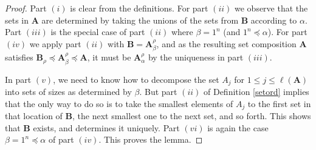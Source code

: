 \documentclass{article}
\theoremstyle{definition}
\begin{document}
\begin{proof}
Part $(i)$ is clear from the definitions. For part $(ii)$ we observe that the sets in $\mathbf{A}$ are determined by taking the unions of the sets from $\mathbf{B}$ according to $\alpha$. Part $(iii)$ is the special case of part $(ii)$ where $\beta=1^{n}$ (and $1^{n}\preceq\alpha$). For part $(iv)$ we apply part $(ii)$ with $\mathbf{B}=\mathbf{A}_{\beta}^{\rho}$, and as the resulting set composition $\mathbf{A}$ satisfies $\mathbf{B}_{\rho}\preceq\mathbf{A}_{\beta}^{\rho}\preceq\mathbf{A}$, it must be $\mathbf{A}_{\alpha}^{\rho}$ by the uniqueness in part $(iii)$.

In part $(v)$, we need to know how to decompose the set $A_{j}$ for $1 \leq j\leq\ell(\mathbf{A})$ into sets of sizes as determined by $\beta$. But part $(ii)$ of Definition \ref{setord} implies that the only way to do so is to take the smallest elements of $A_{j}$ to the first set in that location of $\mathbf{B}$, the next smallest one to the next set, and so forth. This shows that $\mathbf{B}$ exists, and determines it uniquely. Part $(vi)$ is again the case $\beta=1^{n}\preceq\alpha$ of part $(iv)$. This proves the lemma.
\end{proof}
\end{document}
